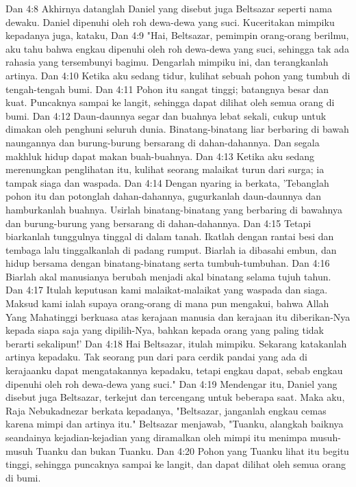 Dan 4:8  Akhirnya datanglah Daniel yang disebut juga Beltsazar seperti nama dewaku. Daniel dipenuhi oleh roh dewa-dewa yang suci. Kuceritakan mimpiku kepadanya juga, kataku,
Dan 4:9  "Hai, Beltsazar, pemimpin orang-orang berilmu, aku tahu bahwa engkau dipenuhi oleh roh dewa-dewa yang suci, sehingga tak ada rahasia yang tersembunyi bagimu. Dengarlah mimpiku ini, dan terangkanlah artinya.
Dan 4:10  Ketika aku sedang tidur, kulihat sebuah pohon yang tumbuh di tengah-tengah bumi.
Dan 4:11  Pohon itu sangat tinggi; batangnya besar dan kuat. Puncaknya sampai ke langit, sehingga dapat dilihat oleh semua orang di bumi.
Dan 4:12  Daun-daunnya segar dan buahnya lebat sekali, cukup untuk dimakan oleh penghuni seluruh dunia. Binatang-binatang liar berbaring di bawah naungannya dan burung-burung bersarang di dahan-dahannya. Dan segala makhluk hidup dapat makan buah-buahnya.
Dan 4:13  Ketika aku sedang merenungkan penglihatan itu, kulihat seorang malaikat turun dari surga; ia tampak siaga dan waspada.
Dan 4:14  Dengan nyaring ia berkata, 'Tebanglah pohon itu dan potonglah dahan-dahannya, gugurkanlah daun-daunnya dan hamburkanlah buahnya. Usirlah binatang-binatang yang berbaring di bawahnya dan burung-burung yang bersarang di dahan-dahannya.
Dan 4:15  Tetapi biarkanlah tunggulnya tinggal di dalam tanah. Ikatlah dengan rantai besi dan tembaga lalu tinggalkanlah di padang rumput. Biarlah ia dibasahi embun, dan hidup bersama dengan binatang-binatang serta tumbuh-tumbuhan.
Dan 4:16  Biarlah akal manusianya berubah menjadi akal binatang selama tujuh tahun.
Dan 4:17  Itulah keputusan kami malaikat-malaikat yang waspada dan siaga. Maksud kami ialah supaya orang-orang di mana pun mengakui, bahwa Allah Yang Mahatinggi berkuasa atas kerajaan manusia dan kerajaan itu diberikan-Nya kepada siapa saja yang dipilih-Nya, bahkan kepada orang yang paling tidak berarti sekalipun!'
Dan 4:18  Hai Beltsazar, itulah mimpiku. Sekarang katakanlah artinya kepadaku. Tak seorang pun dari para cerdik pandai yang ada di kerajaanku dapat mengatakannya kepadaku, tetapi engkau dapat, sebab engkau dipenuhi oleh roh dewa-dewa yang suci."
Dan 4:19  Mendengar itu, Daniel yang disebut juga Beltsazar, terkejut dan tercengang untuk beberapa saat. Maka aku, Raja Nebukadnezar berkata kepadanya, "Beltsazar, janganlah engkau cemas karena mimpi dan artinya itu." Beltsazar menjawab, "Tuanku, alangkah baiknya seandainya kejadian-kejadian yang diramalkan oleh mimpi itu menimpa musuh-musuh Tuanku dan bukan Tuanku.
Dan 4:20  Pohon yang Tuanku lihat itu begitu tinggi, sehingga puncaknya sampai ke langit, dan dapat dilihat oleh semua orang di bumi.
